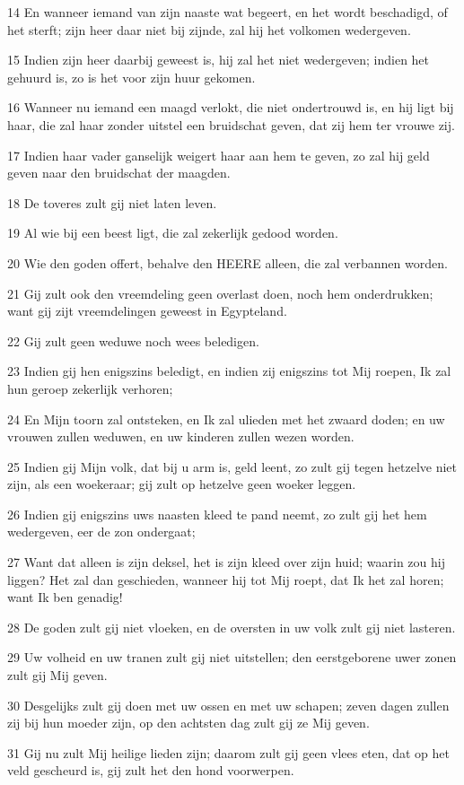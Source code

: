 \par 14 En wanneer iemand van zijn naaste wat begeert, en het wordt beschadigd, of het sterft; zijn heer daar niet bij zijnde, zal hij het volkomen wedergeven.
\par 15 Indien zijn heer daarbij geweest is, hij zal het niet wedergeven; indien het gehuurd is, zo is het voor zijn huur gekomen.
\par 16 Wanneer nu iemand een maagd verlokt, die niet ondertrouwd is, en hij ligt bij haar, die zal haar zonder uitstel een bruidschat geven, dat zij hem ter vrouwe zij.
\par 17 Indien haar vader ganselijk weigert haar aan hem te geven, zo zal hij geld geven naar den bruidschat der maagden.
\par 18 De toveres zult gij niet laten leven.
\par 19 Al wie bij een beest ligt, die zal zekerlijk gedood worden.
\par 20 Wie den goden offert, behalve den HEERE alleen, die zal verbannen worden.
\par 21 Gij zult ook den vreemdeling geen overlast doen, noch hem onderdrukken; want gij zijt vreemdelingen geweest in Egypteland.
\par 22 Gij zult geen weduwe noch wees beledigen.
\par 23 Indien gij hen enigszins beledigt, en indien zij enigszins tot Mij roepen, Ik zal hun geroep zekerlijk verhoren;
\par 24 En Mijn toorn zal ontsteken, en Ik zal ulieden met het zwaard doden; en uw vrouwen zullen weduwen, en uw kinderen zullen wezen worden.
\par 25 Indien gij Mijn volk, dat bij u arm is, geld leent, zo zult gij tegen hetzelve niet zijn, als een woekeraar; gij zult op hetzelve geen woeker leggen.
\par 26 Indien gij enigszins uws naasten kleed te pand neemt, zo zult gij het hem wedergeven, eer de zon ondergaat;
\par 27 Want dat alleen is zijn deksel, het is zijn kleed over zijn huid; waarin zou hij liggen? Het zal dan geschieden, wanneer hij tot Mij roept, dat Ik het zal horen; want Ik ben genadig!
\par 28 De goden zult gij niet vloeken, en de oversten in uw volk zult gij niet lasteren.
\par 29 Uw volheid en uw tranen zult gij niet uitstellen; den eerstgeborene uwer zonen zult gij Mij geven.
\par 30 Desgelijks zult gij doen met uw ossen en met uw schapen; zeven dagen zullen zij bij hun moeder zijn, op den achtsten dag zult gij ze Mij geven.
\par 31 Gij nu zult Mij heilige lieden zijn; daarom zult gij geen vlees eten, dat op het veld gescheurd is, gij zult het den hond voorwerpen.

